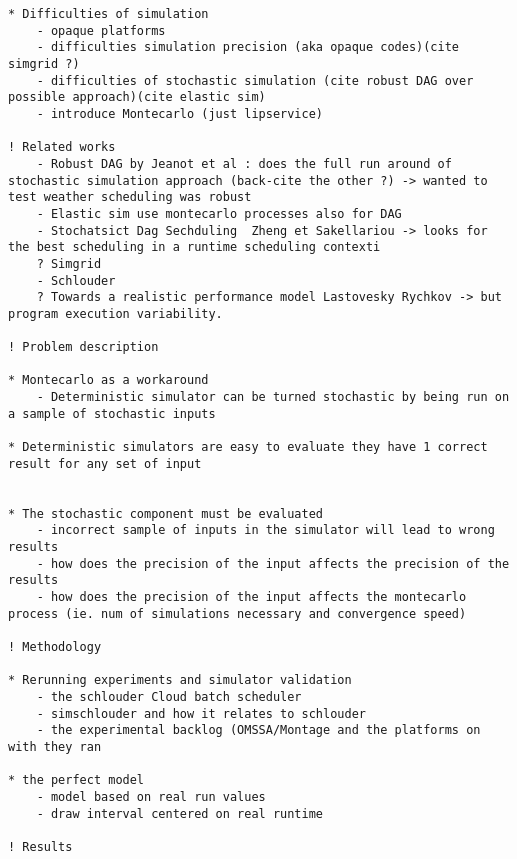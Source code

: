 \documentclass[10pt,conference,compsocconf]{IEEEtran}
\begin{document}
\newpage
\begin{verbatim}
* Difficulties of simulation
	- opaque platforms
	- difficulties simulation precision (aka opaque codes)(cite simgrid ?)
	- difficulties of stochastic simulation (cite robust DAG over possible approach)(cite elastic sim)
	- introduce Montecarlo (just lipservice)

! Related works
	- Robust DAG by Jeanot et al : does the full run around of stochastic simulation approach (back-cite the other ?) -> wanted to test weather scheduling was robust
	- Elastic sim use montecarlo processes also for DAG	
	- Stochatsict Dag Sechduling  Zheng et Sakellariou -> looks for the best scheduling in a runtime scheduling contexti
	? Simgrid
	- Schlouder
	? Towards a realistic performance model Lastovesky Rychkov -> but program execution variability.

! Problem description
	
* Montecarlo as a workaround 
	- Deterministic simulator can be turned stochastic by being run on a sample of stochastic inputs

* Deterministic simulators are easy to evaluate they have 1 correct result for any set of input 


* The stochastic component must be evaluated
	- incorrect sample of inputs in the simulator will lead to wrong results
	- how does the precision of the input affects the precision of the results
	- how does the precision of the input affects the montecarlo process (ie. num of simulations necessary and convergence speed)

! Methodology 

* Rerunning experiments and simulator validation
	- the schlouder Cloud batch scheduler
	- simschlouder and how it relates to schlouder
	- the experimental backlog (OMSSA/Montage and the platforms on with they ran

* the perfect model
	- model based on real run values
	- draw interval centered on real runtime

! Results
\end{verbatim}
\end{document}
